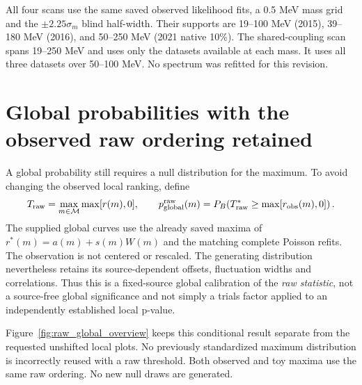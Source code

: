 All four scans use the same saved observed likelihood fits, a 0.5 MeV mass grid and the $\pm2.25\sigma_m$ blind half-width. Their supports are 19--100 MeV (2015), 39--180 MeV (2016), and 50--250 MeV (2021 native 10\%). The shared-coupling scan spans 19--250 MeV and uses only the datasets available at each mass. It uses all three datasets over 50--100 MeV. No spectrum was refitted for this revision.
\clearpage
{}
\FloatBarrier
\clearpage

\section{Global probabilities with the observed raw ordering retained}
A global probability still requires a null distribution for the maximum. To avoid changing the observed local ranking, define
\[
 T_{\rm raw}=\max_{m\in\mathcal M}\max[r(m),0],\qquad
 p_{\rm global}^{\rm raw}(m)=P_B\!\left(T_{\rm raw}^{*}\geq\max[r_{\rm obs}(m),0]\right).
\]
The supplied global curves use the already saved maxima of $r^{*}(m)=a(m)+s(m)W(m)$ and the matching complete Poisson refits. The observation is not centered or rescaled. The generating distribution nevertheless retains its source-dependent offsets, fluctuation widths and correlations. Thus this is a fixed-source global calibration of the \emph{raw statistic}, not a source-free global significance and not simply a trials factor applied to an independently established local p-value.

Figure~\ref{fig:raw_global_overview} keeps this conditional result separate from the requested unshifted local plots. No previously standardized maximum distribution is incorrectly reused with a raw threshold. Both observed and toy maxima use the same raw ordering. No new null draws are generated.


